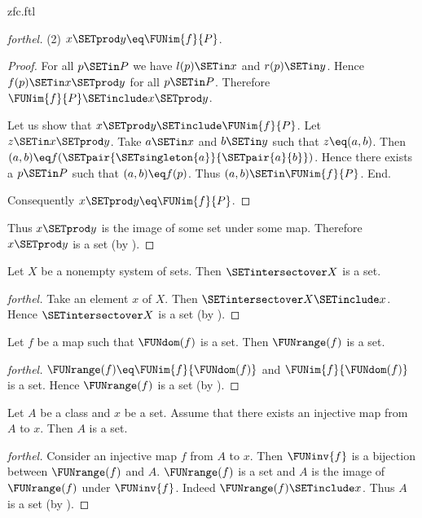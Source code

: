 \documentclass{stex}
\begin{document}
\begin{smodule}{zfc.ftl}
\begin{proof}[forthel]
  (2) $x \SETprod y \eq \FUNim{f}{P}$.
  \begin{proof}
    For all $p \SETin P$ we have $l(p) \SETin x$ and $r(p) \SETin y$.
    Hence $f(p) \SETin x \SETprod y$ for all $p \SETin P$.
    Therefore $\FUNim{f}{P} \SETinclude x \SETprod y$.

    Let us show that $x \SETprod y \SETinclude \FUNim{f}{P}$.
      Let $z \SETin x \SETprod y$.
      Take $a \SETin x$ and $b \SETin y$ such that $z \eq (a,b)$.
      Then $(a,b) \eq f(\SETpair{\SETsingleton{a}}{\SETpair{a}{b}})$.
      Hence there exists a $p \SETin P$ such that $(a,b) \eq f(p)$.
      Thus $(a,b) \SETin \FUNim{f}{P}$.
    End.

    Consequently $x \SETprod y \eq \FUNim{f}{P}$.
  \end{proof}

  Thus $x \SETprod y$ is the image of some set under some map.
  Therefore $x \SETprod y$ is a set (by ).
\end{proof}

\begin{proposition}[forthel,id=FOUNDATIONS_10_5486815207227392]
  Let $X$ be a nonempty system of sets.
  Then $\SETintersectover X$ is a set.
\end{proposition}
\begin{proof}[forthel]
  Take an element $x$ of $X$.
  Then $\SETintersectover X \SETinclude x$.
  Hence $\SETintersectover X$ is a set (by ).
\end{proof}

\begin{proposition}[forthel,id=FOUNDATIONS_10_7598384349184000]
  Let $f$ be a map such that $\FUNdom(f)$ is a set.
  Then $\FUNrange(f)$ is a set.
\end{proposition}
\begin{proof}[forthel]
  $\FUNrange(f) \eq \FUNim{f}{\FUNdom(f)}$ and $\FUNim{f}{\FUNdom(f)}$ is a set.
  Hence $\FUNrange(f)$ is a set (by ).
\end{proof}

\begin{proposition}[forthel,id=FOUNDATIONS_10_8631339572002816]
  Let $A$ be a class and $x$ be a set.
  Assume that there exists an injective map from $A$ to $x$.
  Then $A$ is a set.
\end{proposition}
\begin{proof}[forthel]
  Consider an injective map $f$ from $A$ to $x$.
  Then $\FUNinv{f}$ is a bijection between $\FUNrange(f)$ and $A$.
  $\FUNrange(f)$ is a set and $A$ is the image of $\FUNrange(f)$ under $\FUNinv{f}$.
  Indeed $\FUNrange(f) \SETinclude x$.
  Thus $A$ is a set (by ).
\end{proof}


\end{smodule}
\end{document}
